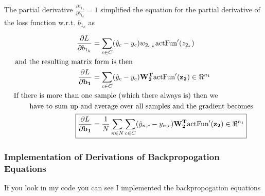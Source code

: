 \documentclass[]{article}
\begin{document}
The partial derivative  $\frac{\partial z_{1_k}} {\partial b_{1_{k}} } =1$ simplified the equation for the partial derivative of the loss function w.r.t. $b_{1_{k}} $ as

\begin{align*}
\frac{\partial L}{\partial b_{1_{k}}} &= \sum_{c\in C}( \hat{y}_c - y_c) w_{2_{c,k}}\text{actFun}'(z_{2_k})\\
\text{and the resulting matrix} &\text{ form is then}\\
\frac{\partial L}{\partial \mathbf{b_1}} &= \sum_{c\in C}( \hat{y}_c - y_c) \mathbf{W_2^T} \text{actFun}'(\mathbf{z_2})\in \Re^{n_1} \\
\text{If there is more than one}&\text{ sample (which there always is) then we}\\
\text{have to sum up and}& \text{ average over all samples and the gradient becomes}\\
\Aboxed{ \frac{\partial L}{\partial \mathbf{b_1}} &=  \frac{1}{N} \sum_{n\in N} \sum_{c\in C}( \hat{y}_{n,c} - y_{n,c}) \mathbf{W_2^T}  \text{actFun}'(\mathbf{z_2})\in \Re^{n_1} } \\
\end{align*}

\subsubsection{Implementation of Derivations of Backpropogation Equations}
If you look in my code you can see I implemented the backpropogation equations
\end{document}
